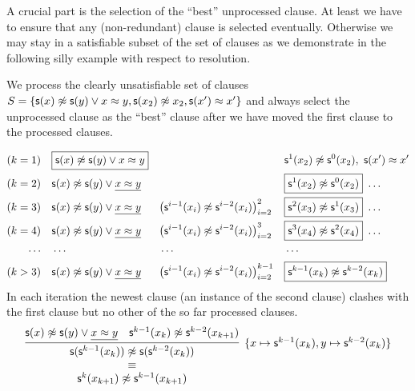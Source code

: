 A crucial part is the selection of the “best” unprocessed clause.
At least we have to ensure that any (non-redundant) clause is selected eventually.
Otherwise we may stay in a satisfiable subset of the set of clauses
as we demonstrate in the following silly example with respect to resolution.
\begin{example}
	We process the clearly unsatisfiable set of clauses
	\( S = \{
		\mathsf{s}(x)\not\approx \mathsf{s}(y)\lor {x\approx y},
		\mathsf{s}(x_2)\not\approx x_2, \mathsf{s}(x')\approx x'
		\} \)
	and always select the  unprocessed clause as the “best” clause
	after we have moved the first clause to the processed clauses.

	\begin{align*}
		(k=1)\quad
		&\boxed{\mathsf{s}(x)\not\approx \mathsf{s}(y)\lor {x\approx y}} &
		&&
		&{ \mathsf{s}^1(x_2)\not\approx \mathsf{s}^0(x_2) },\ { \mathsf{s}(x')\approx x' }
		\\
		(k=2)\quad
		&\mathsf{s}(x)\not\approx \mathsf{s}(y)\lor \underline{x\approx y} &
		&&
		&\boxed{ \mathsf{s}^1(x_2)\not\approx \mathsf{s}^0(x_2) }\ \ldots
		\\
		(k=3)\quad
		&\mathsf{s}(x)\not\approx \mathsf{s}(y)\lor \underline{x\approx y} &
		&{\left(\mathsf{s}^{i-1}(x_{i})\not\approx \mathsf{s}^{i-2}(x_{i})\right)}_{i=2}^{2} &
		&\boxed{ \mathsf{s}^2(x_3)\not\approx \mathsf{s}^1(x_3) }\ \ldots
		\\
		(k=4)\quad
		&\mathsf{s}(x)\not\approx \mathsf{s}(y)\lor \underline{x\approx y} &
		&{\left(\mathsf{s}^{i-1}(x_{i})\not\approx \mathsf{s}^{i-2}(x_{i})\right)}_{i=2}^{3} &
		&\boxed{ \mathsf{s}^3(x_4)\not\approx \mathsf{s}^2(x_4) }\ \ldots
		\\
		\cdots\quad & \cdots && \cdots && \cdots
		\\
		(k>3)\quad
		&\mathsf{s}(x)\not\approx \mathsf{s}(y)\lor \underline{x\approx y} &
		&{\left(\mathsf{s}^{i-1}(x_{i})\not\approx \mathsf{s}^{i-2}(x_{i})\right)}_{i=2}^{k-1} &
		&\boxed{ \mathsf{s}^{k-1}(x_{k})\not\approx \mathsf{s}^{k-2}(x_{k}) }
		\end{align*}
		In each iteration the newest clause
		(an instance of the second clause)
		clashes with the first clause but no other of the so far processed clauses.
		\begin{gather*}
			\infer[
				\{x\mapsto\msucc^{k-1}(x_{k}),
				y\mapsto\msucc^{k-2}(x_{k})\}
				]{
					\begin{array}{c}
					\msucc(\msucc^{k-1}(x_{k}))\mNE \msucc(\msucc^{k-2}(x_{k}))
					\\ \equiv \\
					\msucc^{k}(x_{k+1})\mNE \msucc^{k-1}(x_{k+1})
					\end{array}
				}{
				\msucc(x)\mNE \msucc(y)\lor \underline{x\mEQ y} &
				\msucc^{k-1}(x_{k})\mNE \msucc^{k-2}(x_{k+1})
			}
		\end{gather*}
\end{example}



